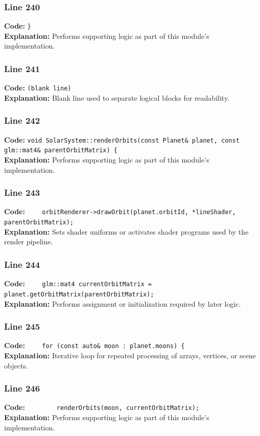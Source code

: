 \documentclass[11pt,a4paper]{article}
\begin{document}
\subsubsection*{Line 240}
\textbf{Code:} \verb|}|\\
\textbf{Explanation:} Performs supporting logic as part of this module's implementation.

\subsubsection*{Line 241}
\textbf{Code:} \texttt{(blank line)}\\
\textbf{Explanation:} Blank line used to separate logical blocks for readability.

\subsubsection*{Line 242}
\textbf{Code:} \verb|void SolarSystem::renderOrbits(const Planet& planet, const glm::mat4& parentOrbitMatrix) {|\\
\textbf{Explanation:} Performs supporting logic as part of this module's implementation.

\subsubsection*{Line 243}
\textbf{Code:} \verb|    orbitRenderer->drawOrbit(planet.orbitId, *lineShader, parentOrbitMatrix);|\\
\textbf{Explanation:} Sets shader uniforms or activates shader programs used by the render pipeline.

\subsubsection*{Line 244}
\textbf{Code:} \verb|    glm::mat4 currentOrbitMatrix = planet.getOrbitMatrix(parentOrbitMatrix);|\\
\textbf{Explanation:} Performs assignment or initialization required by later logic.

\subsubsection*{Line 245}
\textbf{Code:} \verb|    for (const auto& moon : planet.moons) {|\\
\textbf{Explanation:} Iterative loop for repeated processing of arrays, vertices, or scene objects.

\subsubsection*{Line 246}
\textbf{Code:} \verb|        renderOrbits(moon, currentOrbitMatrix);|\\
\textbf{Explanation:} Performs supporting logic as part of this module's implementation.
\end{document}
